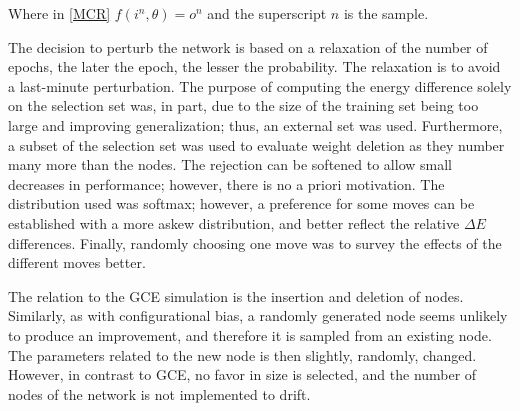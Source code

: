 \noindent
Where in \ref{MCR} $f(i^n, \theta)= o^n$ and the superscript $n$ is the sample.

The decision to perturb the network is based on a relaxation of the number of epochs, the later the epoch, the lesser the probability. The relaxation is to avoid a last-minute perturbation. The purpose of computing the energy difference solely on the selection set was, in part, due to the size of the training set being too large and improving generalization; thus, an external set was used. Furthermore, a subset of the selection set was used to evaluate weight deletion as they number many more than the nodes. The rejection can be softened to allow small decreases in performance; however, there is no a priori motivation. The distribution used was softmax; however, a preference for some moves can be established with a more askew distribution, and better reflect the relative $\Delta E$ differences. Finally, randomly choosing one move was to survey the effects of the different moves better.  

The relation to the GCE simulation is the insertion and deletion of nodes. Similarly, as with configurational bias, a randomly generated node seems unlikely to produce an improvement, and therefore it is sampled from an existing node. The parameters related to the new node is then slightly, randomly, changed. However, in contrast to GCE, no favor in size is selected, and the number of nodes of the network is not implemented to drift.